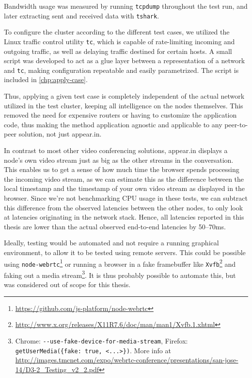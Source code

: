 Bandwidth usage was measured by running \texttt{tcpdump} throughout the test run, and later extracting sent and received data with \texttt{tshark}.

To configure the cluster according to the different test cases, we utilized the Linux traffic control utility \texttt{tc}, which is capable of rate-limiting incoming and outgoing traffic, as well as delaying traffic destined for certain hosts. A small script was developed to act as a glue layer between a representation of a network and \texttt{tc}, making configuration repeatable and easily parametrized. The script is included in \autoref{chp:apply-case}.

Thus, applying a given test case is completely independent of the actual network utilized in the test cluster, keeping all intelligence on the nodes themselves. This removed the need for expensive routers or having to customize the application code, thus making the method application agnostic and applicable to any peer-to-peer solution, not just appear.in.

In contrast to most other video conferencing solutions, appear.in displays a node's own video stream just as big as the other streams in the conversation. This enables us to get a sense of how much time the browser spends processing the incoming video stream, as we can estimate this as the difference between the local timestamp and the timestamp of your own video stream as displayed in the browser. Since we're not benchmarking CPU usage in these tests, we can subtract this difference from the observed latencies between the other nodes, to only look at latencies originating in the network stack. Hence, all latencies reported in this thesis are lower than the actual observed end-to-end latencies by 50--70ms.

Ideally, testing would be automated and not require a running graphical environment, to allow it to be tested using remote servers. This could be possible using \texttt{node-webrtc}\footnote{\url{https://github.com/js-platform/node-webrtc}} or running a browser in a fake framebuffer like \texttt{Xvfb}\footnote{\url{http://www.x.org/releases/X11R7.6/doc/man/man1/Xvfb.1.xhtml}} and faking out a media stream\footnote{Chrome: \texttt{-{}-use-fake-device-for-media-stream}, Firefox: \texttt{getUserMedia(\{fake: true, <...>\})}. More info at \url{http://images.tmcnet.com/expo/webrtc-conference/presentations/san-jose-14/D3-2_Testing_v2_2.pdf}}. It is thus probably possible to automate this, but was considered out of scope for this thesis.

